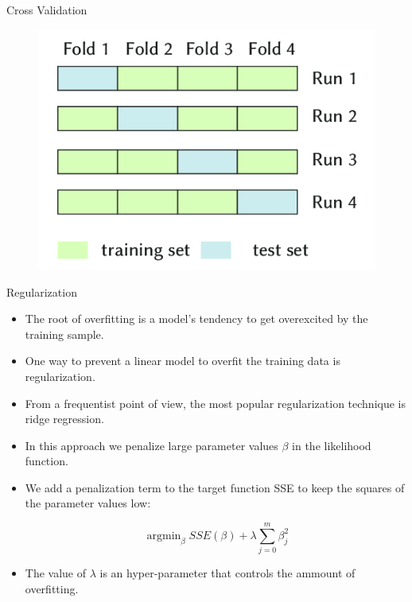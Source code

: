 \documentclass[handout]{beamer}
\begin{document}
\begin{frame}{Cross Validation}
\scriptsize{

\begin{figure}[h!]
	\centering
	\includegraphics[scale=0.5]{pics/crossvalidation.png}
\end{figure}

} 
\end{frame}




\begin{frame}{Regularization}
\scriptsize{

\begin{itemize}

\item The root of overfitting is a model's tendency to get overexcited by the training sample.

\item One way to prevent a linear model to overfit the training data is regularization.

\item  From a frequentist point of view, the most popular regularization technique is ridge regression.


\item In this approach we penalize large parameter values $\beta$ in the likelihood function.

\item We add a penalization term to the target function SSE to keep  the squares of the parameter values low:

\begin{equation}
 \operatorname{argmin}_{\beta} SSE(\beta) + \lambda \sum_{j=0}^m\beta_j^2 
\end{equation} 

\item The value of $\lambda$ is an hyper-parameter that controls the ammount of overfitting.



\end{itemize}


} 
\end{frame}
\end{document}
